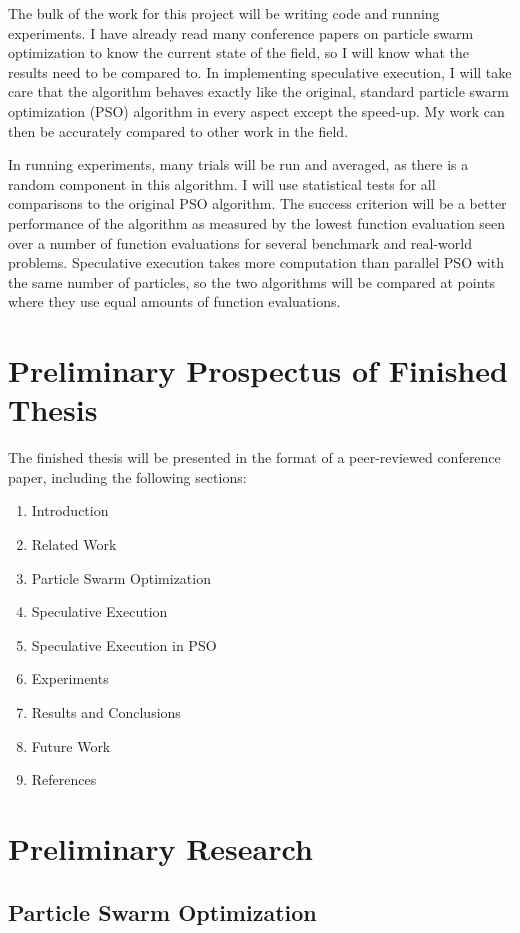 \documentclass[onecolumn, 12pt]{article}
\begin{document}
The bulk of the work for this project will be writing code and running
experiments.  I have already read many conference papers on particle swarm
optimization to know the current state of the field, so I will know what the
results need to be compared to.  In implementing speculative execution, I will
take care that the algorithm behaves exactly like the original, standard
particle swarm optimization (PSO) algorithm in every aspect except the
speed-up.  My work can then be accurately compared to other work in the field.

In running experiments, many trials will be run and averaged, as there is a
random component in this algorithm.  I will use statistical tests for all
comparisons to the original PSO algorithm.  The success criterion will be a
better performance of the algorithm as measured by the lowest function
evaluation seen over a number of function evaluations for several benchmark and
real-world problems.  Speculative execution takes more computation than parallel
PSO with the same number of particles, so the two algorithms will be compared
at points where they use equal amounts of function evaluations.

\section{Preliminary Prospectus of Finished Thesis}

The finished thesis will be presented in the format of a peer-reviewed
conference paper, including the following sections:

\begin{enumerate}
\item Introduction
\item Related Work
\item Particle Swarm Optimization
\item Speculative Execution
\item Speculative Execution in PSO
\item Experiments
\item Results and Conclusions
\item Future Work
\item References
\end{enumerate}

\section{Preliminary Research}

\subsection{Particle Swarm Optimization}
\end{document}
